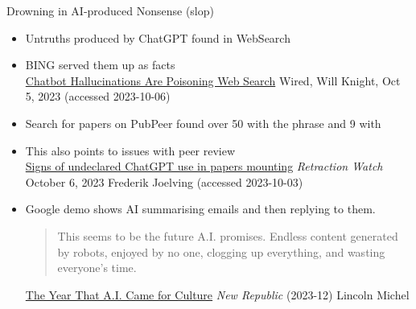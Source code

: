 \begin{frame}{Drowning in AI-produced Nonsense (slop)}

\begin{itemize}
\item Untruths produced by ChatGPT found in WebSearch
\item BING served them up as facts
  \\ {\small \href{https://www.wired.com/story/fast-forward-chatbot-hallucinations-are-poisoning-web-search/}{Chatbot Hallucinations Are Poisoning Web Search} Wired, Will Knight, Oct 5, 2023 (accessed 2023-10-06)}
\item Search for papers on PubPeer found over 50 with the phrase  and 9 with 
\item This also points to issues with peer review
  \\{\small 
\href{https://retractionwatch.com/2023/10/06/signs-of-undeclared-chatgpt-use-in-papers-mounting/}{Signs of undeclared ChatGPT use in papers mounting} \textit{Retraction Watch} October 6, 2023 Frederik Joelving (accessed 2023-10-03)}

\newpage 


\item Google demo shows AI summarising emails and then replying to them.
  \begin{quote}
    This seems to be the future A.I. promises. Endless content generated by robots, enjoyed by no one, clogging up everything, and wasting everyone’s time.
  \end{quote}
  {\small
    \href{https://newrepublic.com/article/177197/year-ai-came-culture}{The Year That A.I. Came for Culture}
\textit{New Republic} (2023-12) Lincoln Michel }


\end{itemize}


\end{frame}

